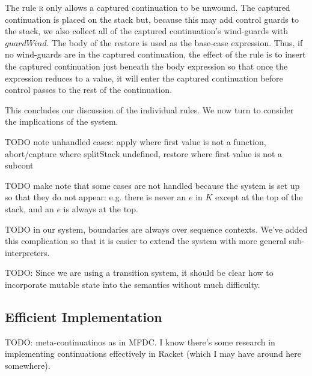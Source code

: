 \documentclass[11pt]{article}
\begin{document}
The rule \textsc{r} only allows a captured continuation to be unwound.
The captured continuation is placed on the stack but, because this may add control guards to the stack, we also collect all of the captured continuation's wind-guards with $guardWind$.
The body of the restore is used as the base-case expression.
Thus, if no wind-guards are in the captured continuation, the effect of the rule is to insert the captured continuation just beneath the body expression so that once the expression reduces to a value, it will enter the captured continuation before control passes to the rest of the continuation.




This concludes our discussion of the individual rules.
We now turn to consider the implications of the system.

TODO note unhandled cases: apply where first value is not a function, abort/capture where splitStack undefined, restore where first value is not a subcont

TODO make note that some cases are not handled because the system is set up so that they do not appear: e.g. there is never an $e$ in $K$ except at the top of the stack, and an $e$ is always at the top.

TODO in our system, boundaries are always over sequence contexts. We've added this complication so that it is easier to extend the system with more general sub-interpreters.

TODO: Since we are using a transition system, it should be clear how to incorporate mutable state into the semantics without much difficulty.

\subsection{Efficient Implementation}

TODO: meta-continuatinos as in MFDC. I know there's some research in implementing continuations effectively in Racket (which I may have around here somewhere).
\end{document}
